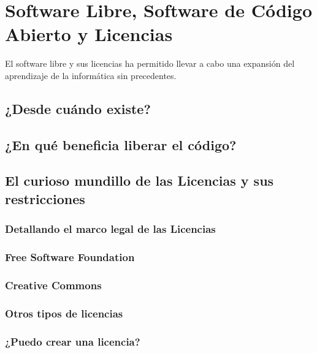 \section{Software Libre, Software de Código Abierto y Licencias}
El software libre y sus licencias \cite{gplv3} ha permitido llevar a cabo una expansión del
aprendizaje de la informática sin precedentes.
\subsection{¿Desde cuándo existe?}

\subsection{¿En qué beneficia liberar el código?}

\subsection{El curioso mundillo de las Licencias y sus restricciones}

\subsubsection{Detallando el marco legal de las Licencias}

\subsubsection{Free Software Foundation}

\subsubsection{Creative Commons}

\subsubsection{Otros tipos de licencias}

\subsubsection{¿Puedo crear una licencia?}
